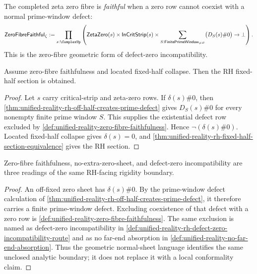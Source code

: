 \begin{definition}
\label{def:unified-reality-zero-fibre-faithfulness}
The completed zeta zero fibre is \emph{faithful} when a zero row cannot
coexist with a normal prime-window defect:
$$
\mathsf{ZeroFibreFaithful}_{\zeta}
:=
\prod_{s:\ComplexUp}
\left(
\mathsf{ZetaZero}(s)
\times
\mathsf{InCritStrip}(s)
\times
\sum_{S:\mathsf{FinitePrimeWindow}_{\ne\varnothing}}
\bigl(D_S(s)\#0\bigr)
\to
\bot
\right).
$$
This is the zero-fibre geometric form of defect-zero incompatibility.
\end{definition}

\begin{theorem}
\label{thm:unified-reality-zero-fibre-faithfulness-gives-rh-section}
Assume zero-fibre faithfulness and located fixed-half collapse.  Then the
RH fixed-half section is obtained.
\end{theorem}

\begin{proof}
Let $s$ carry critical-strip and zeta-zero rows.  If
$\delta(s)\#0$, then
\autoref{thm:unified-reality-rh-off-half-creates-prime-defect} gives
$D_S(s)\#0$ for every nonempty finite prime window $S$.  This supplies
the existential defect row excluded by
\autoref{def:unified-reality-zero-fibre-faithfulness}.  Hence
$\neg(\delta(s)\#0)$.  Located fixed-half collapse gives
$\delta(s)=0$, and
\autoref{thm:unified-reality-rh-fixed-half-section-equivalence} gives
the RH section.
\end{proof}

\begin{theorem}
\label{thm:unified-reality-zero-fibre-faithfulness-normal-sheet-defect-rigidity}
Zero-fibre faithfulness, no-extra-zero-sheet, and defect-zero
incompatibility are three readings of the same RH-facing rigidity
boundary.
\end{theorem}

\begin{proof}
An off-fixed zero sheet has $\delta(s)\#0$.  By the prime-window defect
calculation of
\autoref{thm:unified-reality-rh-off-half-creates-prime-defect}, it
therefore carries a finite prime-window defect.  Excluding coexistence
of that defect with a zero row is
\autoref{def:unified-reality-zero-fibre-faithfulness}.  The same
exclusion is named as defect-zero incompatibility in
\autoref{def:unified-reality-rh-defect-zero-incompatibility-route} and
as no far-end absorption in
\autoref{def:unified-reality-no-far-end-absorption}.  Thus the geometric
normal-sheet language identifies the same unclosed analytic boundary;
it does not replace it with a local conformality claim.
\end{proof}
